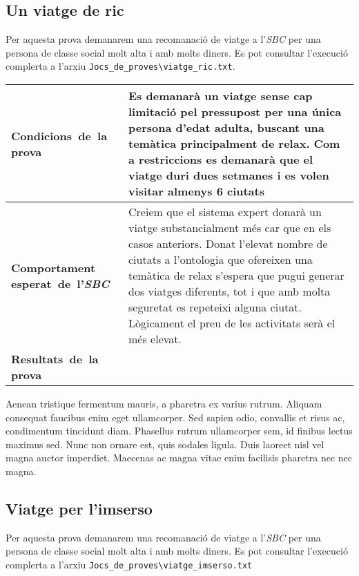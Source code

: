 \documentclass[11pt,a4paper]{article}
\begin{document}
\subsection{Un viatge de ric}
Per aquesta prova demanarem una recomanació de viatge a l'\emph{SBC} per una persona de classe social molt alta i amb molts diners. Es pot consultar l'execució complerta a l'arxiu \texttt{Jocs\_de\_proves\textbackslash viatge\_ric.txt}. \\

\noindent
\begin{tabular}{|p{}|p{}|}

\hline
\textbf{\mbox{Condicions de la} \mbox{prova}} & Es demanarà un viatge sense cap limitació pel pressupost per una única persona d'edat adulta, buscant una temàtica principalment de relax. Com a restriccions es demanarà que el viatge duri dues setmanes i es volen visitar almenys 6 ciutats\\
\hline
\textbf{Comportament \mbox{esperat de l'\emph{SBC}}} & Creiem que el sistema expert donarà un viatge substancialment més car que en els casos anteriors. Donat l'elevat nombre de ciutats a l'ontologia que ofereixen una temàtica de relax s'espera que pugui generar dos viatges diferents, tot i que amb molta seguretat es repeteixi alguna ciutat. Lògicament el preu de les activitats serà el més elevat.\\
\hline
\textbf{\mbox{Resultats de la} \mbox{prova}} & \\
\hline
\end{tabular}

Aenean tristique fermentum mauris, a pharetra ex varius rutrum. Aliquam consequat faucibus enim eget ullamcorper. Sed sapien odio, convallis et risus ac, condimentum tincidunt diam. Phasellus rutrum ullamcorper sem, id finibus lectus maximus sed. Nunc non ornare est, quis sodales ligula. Duis laoreet nisl vel magna auctor imperdiet. Maecenas ac magna vitae enim facilisis pharetra nec nec magna.

\subsection{Viatge per l'imserso}
Per aquesta prova demanarem una recomanació de viatge a l'\emph{SBC} per una persona de classe social molt alta i amb molts diners. Es pot consultar l'execució complerta a l'arxiu \texttt{Jocs\_de\_proves\textbackslash viatge\_imserso.txt} \\
\end{document}
